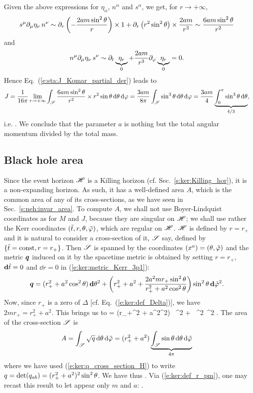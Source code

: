 Given the above expressions for $\eta_\alpha$, $n^\alpha$ and $s^\alpha$,
we get, for $r\rightarrow+\infty$,
\[
  s^\mu \partial_\mu \eta_\nu \, n^\nu \sim \partial_r \left( - \frac{2 a m \sin^2\theta}{r} \right) \times 1 + \partial_r \left(r^2 \sin^2\theta \right) \times \frac{2 a m}{r^3}
    \sim \frac{6 a m \sin^2\theta}{r^2}
\]
and
\[
    n^\mu \partial_\mu \eta_\nu \, s^\nu \sim \partial_t \underbrace{\eta_r}_{0}
        + \frac{2 a m}{r^3} \partial_\varphi \underbrace{\eta_r}_{0}  = 0 .
\]
Hence Eq.~(\ref{e:sta:J_Komar_partial_der}) leads to
\[
    J = \frac{1}{16\pi} \lim_{r\rightarrow +\infty}
        \int_{\mathscr{S}}
        \frac{6 a m \sin^2\theta}{r^2} \times
        r^2\sin\theta \, \mathrm{d}\theta\, \mathrm{d}\varphi  =
        \frac{3 a m}{8\pi} \int_{\mathscr{S}} \sin^3\theta \, \mathrm{d}\theta\, \mathrm{d}\varphi
        = \frac{3 a m}{4} \underbrace{\int_0^\pi \sin^3\theta \, \mathrm{d}\theta}_{4/3} ,
\]
i.e.
\be \label{e:ker:J_am}
     .
\ee
We conclude that the parameter $a$ is nothing but the total angular momentum
divided by the total mass.

\subsection{Black hole area}

Since the event horizon $\mathscr{H}$ is a Killing horizon (cf. Sec.~\ref{s:ker:Killing_hor}),
it is a non-expanding horizon. As such, it has a well-defined
area $A$, which is the
common area of any of its cross-sections, as we have seen in
Sec.~\ref{s:neh:invar_area}. To compute $A$, we shall not use Boyer-Lindquist
coordinates as for $M$ and $J$, because they are singular on $\mathscr{H}$; we shall
use rather the Kerr coordinates $({\tilde t}, r, \theta,{\tilde\varphi})$, which are regular
on $\mathscr{H}$. $\mathscr{H}$ is defined by $r=r_+$ and it is natural to consider a
cross-section of it, $\mathscr{S}$ say, defined by $\{{\tilde t}=\mathrm{const}, r=r_+\}$.
Then $\mathscr{S}$ is spanned by the coordinates $(x^a) = (\theta,{\tilde\varphi})$ and the metric $\bm{q}$
induced on it by the spacetime metric is obtained by setting $r=r_+$,
$\mathbf{d}{\tilde t}=0$ and $\dd r = 0$ in (\ref{e:ker:metric_Kerr_3p1}):
\[
        \bm{q} =
   (r_+^2 + a^2\cos^2\theta)\, \mathbf{d} \theta^2
    + \left( r_+^2 + a^2 + \frac{2 a^2 m r_+ \sin^2\theta}{r_+^2 + a^2\cos^2\theta} \right)
    \sin^2\theta \, \mathbf{d} {\tilde\varphi}^2 .
\]
Now, since $r_+$ is a zero of $\Delta$ [cf. Eq.~(\ref{e:ker:def_Delta})],
we have $2 m r_+ = r_+^2 + a^2 $. This brings us to
\be \label{e:ker:q_cross_section_H}
         =
  (r_+^2 + a^2\cos^2\th) \, \dd \th^2
    + \,
    \sin^2\th \, \dd \tph^2 .
\ee
The area of the cross-section $\mathscr{S}$ is
\[
    A = \int_{\mathscr{S}} \sqrt{q} \, \mathrm{d}\theta\, \mathrm{d}{\tilde\varphi}
      = (r_+^2 + a^2) \underbrace{\int_{\mathscr{S}} \sin\theta \, \mathrm{d}\theta\, \mathrm{d}{\tilde\varphi}}_{4\pi}
\]
where we have used (\ref{e:ker:q_cross_section_H}) to write
$q = \det (q_{ab}) = (r_+^2 + a^2)^2 \sin^2\theta$.
We have thus
\be \label{e:ker:A_rp_a_m}
     .
\ee
Via (\ref{e:ker:def_r_pm}),
one may recast this result to let appear only $m$ and $a$:
\be \label{e:ker:A_a_m}
     .
\ee

